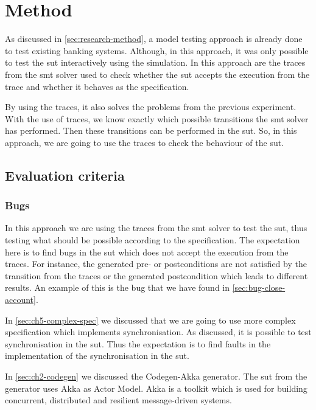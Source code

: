 \section{Method}

As discussed in \autoref{sec:research-method}, a model testing approach is
already done to test existing banking systems. Although, in this approach, it
was only possible to test the \gls{sut} interactively using the simulation. In this
approach are the traces from the \gls{smt} solver used to check whether the
\gls{sut} accepts the execution from the trace and whether it behaves as the
specification.~\cite[p.5]{stoel_storm_vinju_bosman_2016}

By using the traces, it also solves the problems from the previous experiment.
With the use of traces, we know exactly which possible transitions the
\gls{smt} solver has performed. Then these transitions can be performed in the \gls{sut}.
So, in this approach, we are going to use the traces to check the behaviour of the
\gls{sut}.

\subsection{Evaluation criteria}\label{sec:ch5-eval-criteria}

\subsubsection{Bugs}
In this approach we are using the traces from the \gls{smt} solver to test the
\gls{sut}, thus testing what should be possible according to the specification.
The expectation here is to find bugs in the \gls{sut} which does not accept the
execution from the traces. For instance, the generated pre- or postconditions
are not satisfied by the transition from the traces or the generated
postcondition which leads to different results. An example of this is the bug
that we have found in \autoref{sec:bug-close-account}.

In \autoref{sec:ch5-complex-spec} we discussed that we are going to use more
complex specification which implements synchronisation. As discussed, it is
possible to test synchronisation in the \gls{sut}. Thus the expectation is to
find faults in the implementation of the synchronisation in the \gls{sut}.

In \autoref{sec:ch2-codegen} we discussed the Codegen-Akka generator. The
\gls{sut} from the generator uses Akka as Actor Model. Akka is a toolkit
which is used for building concurrent, distributed and resilient
message-driven systems.~\cite[p.~4]{roestenburg2016akka}

